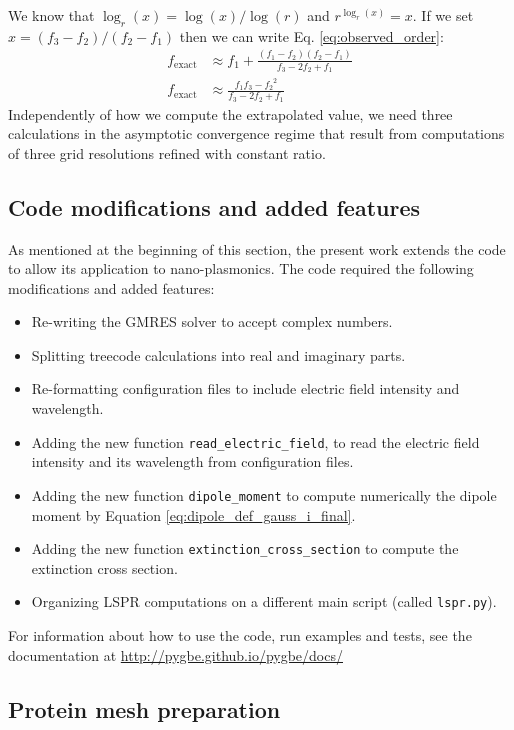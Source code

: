 We know that $\log_r(x) = \log(x)/\log(r)$ and $r^{\log_r(x)} = x$. If we set $x = (f_3 - f_2)/(f_2 -f_1)$ 
then we can write Eq. \eqref{eq:observed_order}:
%
\begin{align} \label{eq:rich_extr2}
   f_{\text{exact}} &\approx f_1 + \frac{(f_1 - f_2)(f_2 -f_1)}{f_3-2f_2+f_1} \\
   f_{\text{exact}} &\approx \frac{f_1f_3 -{f_2}^2}{f_3-2f_2+f_1}
\end{align} 
%
Independently of how we compute the extrapolated value, we need three
calculations in the asymptotic convergence regime that result from computations
of three grid resolutions refined with constant ratio.

\subsection{Code modifications and added features} \label{sec:code_imp}

As mentioned at the beginning of this section, the present work extends the \pygbe code
to allow its application to nano-plasmonics. 
The code required the following modifications and added features:

\begin{itemize}
    \item Re-writing the GMRES solver to accept complex numbers. 
    \item Splitting treecode calculations into real and imaginary parts.
    \item Re-formatting configuration files to include electric field intensity and  wavelength.
    \item Adding the new function \texttt{read\_electric\_field}, to read the electric field intensity and its wavelength from configuration files.
    \item Adding the new function \texttt{dipole\_moment} to compute numerically the dipole moment by Equation \eqref{eq:dipole_def_gauss_i_final}.
    \item Adding the new function \texttt{extinction\_cross\_section} to compute the extinction cross section.
    \item Organizing LSPR computations on a different main script (called \texttt{lspr.py}).
\end{itemize}

For information about how to use the code, run examples and tests, see the
\pygbe documentation at \url{http://pygbe.github.io/pygbe/docs/}

\subsection{Protein mesh preparation}

